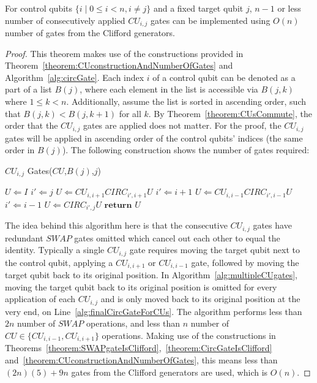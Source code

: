 \begin{theorem}
\label{theorem:multipleCuGates}
For control qubits $\{i \mid 0 \leq i < n, i \neq j\}$ and a fixed target qubit $j$, $n-1$ or less number of consecutively applied $\mathit{CU}_{i,j}$ gates can be implemented using $O \left(n \right)$ number of gates from the Clifford generators.
\end{theorem}
\begin{proof}
This theorem makes use of the constructions provided in Theorem~\ref{theorem:CUconstructionAndNumberOfGates} and Algorithm~\ref{alg:circGate}. Each index $i$ of a control qubit can be denoted as a part of a list $B(j)$, where each element in the list is accessible via $B(j,k)$ where $1 \leq k < n$. Additionally, assume the list is sorted in ascending order, such that $B(j,k) < B(j,k+1)$ for all $k$. By Theorem~\ref{theorem:CUsCommute}, the order that the $\mathit{CU}_{i,j}$ gates are applied does not matter. For the proof, the $\mathit{CU}_{i,j}$ gates will be applied in ascending order of the control qubits' indices (the same order in $B(j)$). The following construction shows the number of gates required:
\begin{algorithm}[H]
  \caption{$\mathit{CU}_{i,j}$ Gates($\mathit{CU}$,$B(j)$,$j$)}  \label{alg:multipleCUgates}
  \begin{algorithmic}[1]
  \State $U \Longleftarrow I$
  \State $i' \Longleftarrow j$
    \State $U \Longleftarrow \mathit{CU}_{i,i+1}\mathit{CIRC}_{i',i+1}U$
    \State $i' \Longleftarrow i+1$
  \EndFor
    \State $U \Longleftarrow \mathit{CU}_{i,i-1}\mathit{CIRC}_{i',i-1}U$
    \State $i' \Longleftarrow i-1$
  \EndFor
  \State $U \Longleftarrow \mathit{CIRC}_{i',j}U$ \label{alg:finalCircGateForCUs}
  \State $\mathbf{return}$ $U$
  \end{algorithmic}
\end{algorithm}
The idea behind this algorithm here is that the consecutive $\mathit{CU}_{i,j}$ gates have redundant $\mathit{SWAP}$ gates omitted which cancel out each other to equal the identity. Typically a single $\mathit{CU}_{i,j}$ gate requires moving the target qubit next to the control qubit, applying a $\mathit{CU}_{i,i+1}$ or $\mathit{CU}_{i,i-1}$ gate, followed by moving the target qubit back to its original position. In Algorithm~\ref{alg:multipleCUgates}, moving the target qubit back to its original position is omitted for every application of each $\mathit{CU}_{i,j}$ and is only moved back to its original position at the very end, on Line~\ref{alg:finalCircGateForCUs}. The algorithm performs less than $2n$ number of $\mathit{SWAP}$ operations, and less than $n$ number of $\mathit{CU} \in \{\mathit{CU}_{i,i-1}, \mathit{CU}_{i,i+1}\}$ operations. Making use of the constructions in Theorems~\ref{theorem:SWAPgateIsClifford},~\ref{theorem:CircGateIsClifford} and~\ref{theorem:CUconstructionAndNumberOfGates}, this means less than $(2n)(5) + 9n$ gates from the Clifford generators are used, which is $O \left(n \right)$.
\end{proof}

